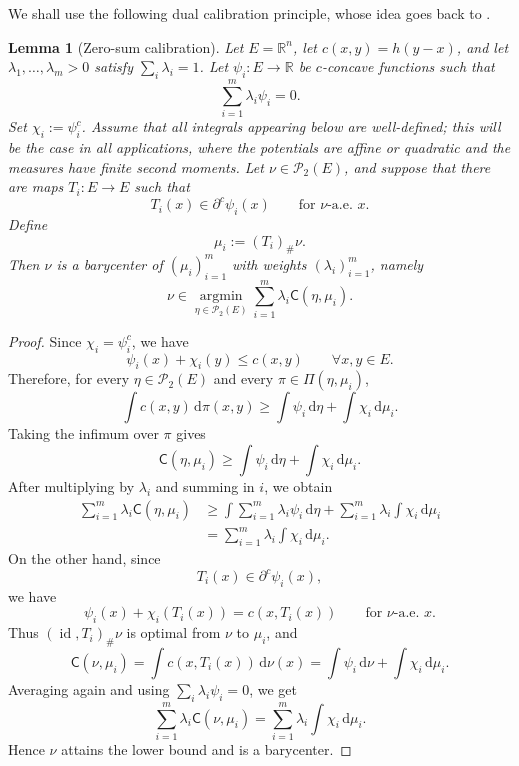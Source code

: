 \documentclass[10pt,a4paper]{amsart}
\numberwithin{equation}{section}
\newtheorem{lemma}[theorem]{Lemma}
\newcommand{\id}{\operatorname{id}}
\newcommand{\dd}{\mathrm d}
\begin{document}
	
	
	
	
	
	
	
	
	
	
	We shall use the following dual calibration principle, whose idea goes back to \cite{CarlierEkeland2010}.
	
	\begin{lemma}[Zero-sum calibration]
		\label{lem:dual-calibration}
		Let \(E=\mathbb R^n\), let \(c(x,y)=h(y-x)\), and let
		\(\lambda_1,\ldots,\lambda_m>0\) satisfy \(\sum_i\lambda_i=1\).
		Let \(\psi_i:E\to\mathbb R\) be \(c\)-concave functions such that
		\[
		\sum_{i=1}^m \lambda_i\psi_i=0.
		\]
		Set \(\chi_i:=\psi_i^c\). Assume that all integrals appearing below are well-defined; this will be the
		case in all applications, where the potentials are affine or quadratic and the
		measures have finite second moments. Let \(\nu\in\mathcal P_2(E)\), and suppose that
		there are maps \(T_i:E\to E\) such that
		\[
		T_i(x)\in\partial^c\psi_i(x)
		\qquad\text{for \(\nu\)-a.e. }x.
		\]
		Define
		\[
		\mu_i:=(T_i)_\#\nu.
		\]
		Then \(\nu\) is a barycenter of \((\mu_i)_{i=1}^m\) with weights
		\((\lambda_i)_{i=1}^m\), namely
		\[
		\nu\in\operatorname*{argmin}_{\eta\in\mathcal P_2(E)}
		\sum_{i=1}^m\lambda_i \mathsf C(\eta,\mu_i).
		\]
		
	\end{lemma}
	
	\begin{proof}
		Since \(\chi_i=\psi_i^c\), we have
		\[
		\psi_i(x)+\chi_i(y)\le c(x,y)
		\qquad\forall x,y\in E.
		\]
		Therefore, for every \(\eta\in\mathcal P_2(E)\) and every
		\(\pi\in\Pi(\eta,\mu_i)\),
		\[
		\int c(x,y)\,\dd\pi(x,y)
		\ge
		\int\psi_i\,\dd\eta+\int\chi_i\,\dd\mu_i.
		\]
		Taking the infimum over \(\pi\) gives
		\[
		\mathsf C(\eta,\mu_i)
		\ge
		\int\psi_i\,\dd\eta+\int\chi_i\,\dd\mu_i.
		\]
		After multiplying by \(\lambda_i\) and summing in \(i\), we obtain
		\[
		\begin{aligned}
			\sum_{i=1}^m\lambda_i \mathsf C(\eta,\mu_i)
			&\ge
			\int\sum_{i=1}^m\lambda_i\psi_i\,\dd\eta
			+
			\sum_{i=1}^m\lambda_i\int\chi_i\,\dd\mu_i \\
			&=
			\sum_{i=1}^m\lambda_i\int\chi_i\,\dd\mu_i.
		\end{aligned}
		\]
		On the other hand, since
		\[
		T_i(x)\in\partial^c\psi_i(x),
		\]
		we have
		\[
		\psi_i(x)+\chi_i(T_i(x))=c(x,T_i(x))
		\qquad\text{for \(\nu\)-a.e. }x.
		\]
		Thus \((\id,T_i)_\#\nu\) is optimal from \(\nu\) to \(\mu_i\), and
		\[
		\mathsf C(\nu,\mu_i)
		=
		\int c(x,T_i(x))\,\dd\nu(x)
		=
		\int\psi_i\,\dd\nu+\int\chi_i\,\dd\mu_i.
		\]
		Averaging again and using \(\sum_i\lambda_i\psi_i=0\), we get
		\[
		\sum_{i=1}^m\lambda_i \mathsf C(\nu,\mu_i)
		=
		\sum_{i=1}^m\lambda_i\int\chi_i\,\dd\mu_i.
		\]
		Hence \(\nu\) attains the lower bound and is a barycenter.
	\end{proof}
	
\end{document}
